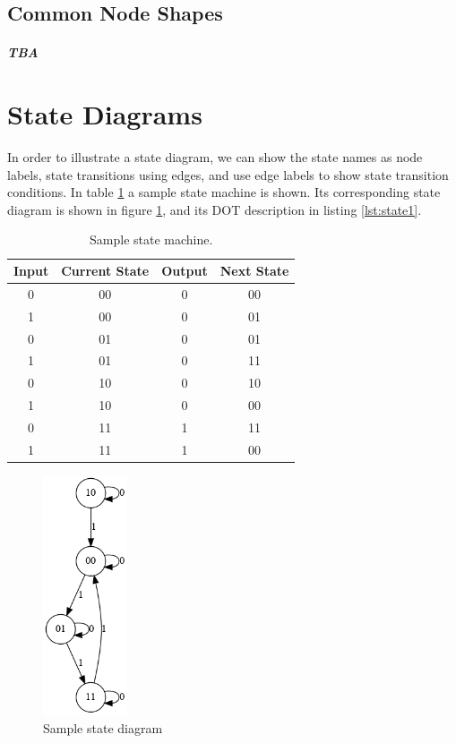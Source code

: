 \documentclass{article}
\begin{document}
	\subsection{Common Node Shapes}
	\subparagraph{TBA}

	\section{State Diagrams}
	In order to illustrate a state diagram, we can show the state names as node labels, state transitions using edges, and use edge labels to show state transition conditions. In table \ref{tbl:state1} a sample state machine is shown. Its corresponding state diagram is shown in figure \ref{fig:state1}, and its DOT description in listing \ref{lst:state1}.

	\begin{table}[H]
		\begin{center}
			\caption{Sample state machine.}
			\label{tbl:state1}
			\begin{tabular}{c|c|c|c}
				\textbf{Input} & \textbf{Current State} & \textbf{Output} & \textbf{Next State}\\
				\hline
				0 & 00 & 0 & 00\\
				1 & 00 & 0 & 01\\
				0 & 01 & 0 & 01\\
				1 & 01 & 0 & 11\\
				0 & 10 & 0 & 10\\
				1 & 10 & 0 & 00\\
				0 & 11 & 1 & 11\\
				1 & 11 & 1 & 00\\
			\end{tabular}
		\end{center}
	\end{table}

	\begin{figure}[H]
		\begin{center}
			\includegraphics[width=25mm]{state1.png}
		\end{center}
		\caption{Sample state diagram}
		\label{fig:state1}
	\end{figure}
\end{document}
